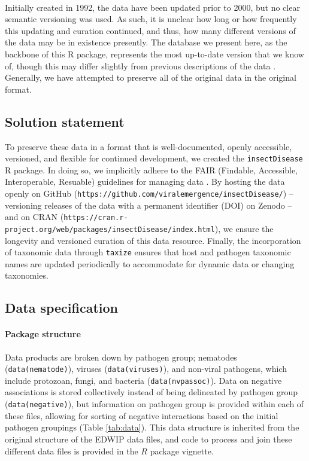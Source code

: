 \documentclass[12pt]{article}
\begin{document}
\paragraph*{}
Initially created in 1992, the data have been updated prior to 2000, but no clear semantic versioning was used. As such, it is unclear how long or how frequently this updating and curation continued, and thus, how many different versions of the data may be in existence presently. The database we present here, as the backbone of this R package, represents the most up-to-date version that we know of, though this may differ slightly from previous descriptions of the data \citep{braxton2003}. Generally, we have attempted to preserve all of the original data in the original format.




\subsection*{Solution statement}
To preserve these data in a format that is well-documented, openly accessible, versioned, and flexible for continued development, we created the \texttt{insectDisease} R package. In doing so, we implicitly adhere to the FAIR (Findable, Accessible, Interoperable, Resuable) guidelines for managing data \citep{wilkinson2016}. By hosting the data openly on GitHub (\texttt{https://github.com/viralemergence/insectDisease/}) -- versioning releases of the data with a permanent identifier (DOI) on Zenodo -- and on CRAN (\texttt{https://cran.r-project.org/web/packages/insectDisease/index.html}), we ensure the longevity and versioned curation of this data resource. Finally, the incorporation of taxonomic data through \texttt{taxize} \citep{chamberlain2013} ensures that host and pathogen taxonomic names are updated periodically to accommodate for dynamic data or changing taxonomies. 





\subsection*{Data specification}

\paragraph*{Package structure}
Data products are broken down by pathogen group; nematodes (\texttt{data(nematode)}), viruses (\texttt{data(viruses)}), and non-viral pathogens, which include protozoan, fungi, and bacteria (\texttt{data(nvpassoc)}). Data on negative associations is stored collectively instead of being delineated by pathogen group (\texttt{data(negative)}), but information on pathogen group is provided within each of these files, allowing for sorting of negative interactions based on the initial pathogen groupings (Table \ref{tab:data}). This data structure is inherited from the original structure of the EDWIP data files, and code to process and join these different data files is provided in the $R$ package vignette. 
\end{document}
